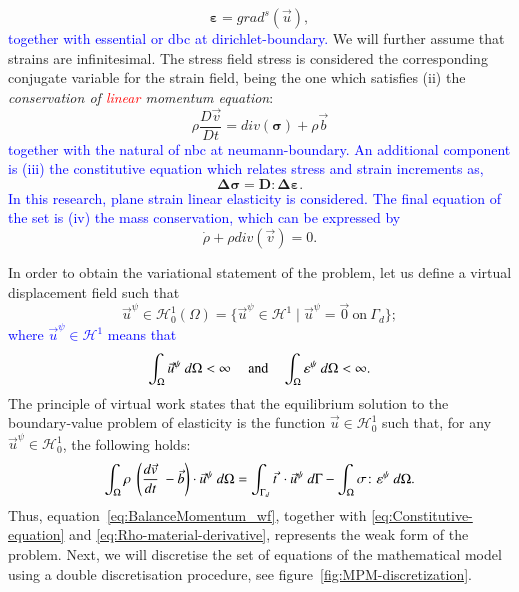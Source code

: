 \documentclass[preprint,12pt,a4paper]{elsarticle}
\newcommand{\tens}[1]{
  \ensuremath{\mathbf{{#1}}}
}
\newcommand{\Div}[1]{
  \ensuremath{div({#1})}
}
\newcommand\GradS[1]{grad^s({#1})}
\newcommand{\Integral}[2]{
  \IfStrEqCase{#1}{
    {2}{\ensuremath{\int_{\Gamma_d}{#2}\ d\Gamma}}
    {3}{\ensuremath{\int_{\Omega}{#2}\ d\Omega}}
  }
}
\begin{document}
\begin{equation}
  \label{eq:Compatibility-equation}
  \tens{\varepsilon} = \GradS{\vec{u}},
\end{equation}
\textcolor{blue}{together with essential or \acrfull{dbc} at \gls{dirichlet-boundary}.} We will further assume that 
strains are infinitesimal. The stress field \gls{stress} is considered the corresponding
conjugate variable for the strain field, being the one which
satisfies (ii) the \textit{conservation of \textcolor{red}{linear} momentum equation}:
\begin{equation}
  \label{eq:Balance-momentum}
\rho \frac{D\vec{v}}{Dt} = \Div{\tens{\sigma}} + \rho \vec{b}
\end{equation}
\textcolor{blue}{together with the natural of \acrfull{nbc} at \gls{neumann-boundary}. An additional component is (iii) the constitutive equation which relates stress and strain increments as,}
{\color{red}
\begin{equation}
  \label{eq:Constitutive-equation}
\tens{\Delta \sigma} = \tens{D} \colon \tens{\Delta \varepsilon}.
\end{equation}
}
\textcolor{blue}{
In this research, plane strain linear elasticity is considered. The final equation of the set is (iv) the mass conservation, which can be expressed by} 
\begin{equation}
  \label{eq:Rho-material-derivative}
    \dot{\rho} + \rho \Div{\vec{v}} = 0.
\end{equation}

In order to obtain the variational statement of the problem, let us define a
virtual displacement field such that
\begin{equation}
  \label{eq:Hilbert-space}
  \vec{u}^{\psi} \in \mathcal{H}^1_0(\Omega) = \{ \vec{u}^{\psi} \in
  \mathcal{H}^1 \mid \vec{u}^{\psi} = \vec{0}\ \text{on}\ \Gamma_d \};
\end{equation}
\textcolor{blue}{where $\vec{u}^{\psi} \in \mathcal{H}^1$ means that}
\begin{equation}
  \label{eq:cauchy-secuence}
  \Integral{3}{\vec{u}^{\psi}} < \infty\ \quad\text{and}\quad
  \Integral{3}{\tens{\varepsilon}^{\psi}} < \infty.
\end{equation}
The principle of virtual work states that the equilibrium solution to
the boundary-value problem of elasticity is the function $\vec{u} \in
\mathcal{H}^1_0$ such that, for any $\vec{u}^{\psi} \in
\mathcal{H}^1_0$,
the following holds:
\begin{equation}
  \label{eq:BalanceMomentum_wf}
  \Integral{3}{\rho\ \left( \frac{d\vec{v}}{dt}\ - \vec{b} \right) \cdot \vec{u}^{\psi}} =
  \Integral{2}{\vec{t}\ \cdot \vec{u}^{\psi}} - \Integral{3}{\tens{\sigma} \colon
   \tens{\varepsilon}^{\psi}}.
\end{equation}
Thus, equation~\eqref{eq:BalanceMomentum_wf}, together with
\eqref{eq:Constitutive-equation} and
\eqref{eq:Rho-material-derivative}, represents the weak form of the problem. Next, we will discretise the set of equations of the mathematical model using a double discretisation procedure, see figure~\ref{fig:MPM-discretization}.\\
\end{document}
